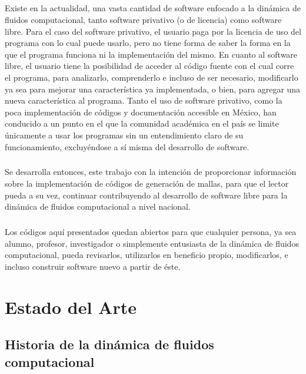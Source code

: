 \documentclass[letterpaper, openright, 12pt]{book}
\begin{document}
    \paragraph*{}
    Existe en la actualidad, una vasta cantidad de software enfocado a la
    dinámica de fluidos computacional, tanto software privativo (o de
    licencia) como software libre. Para el caso del software privativo, el
    usuario paga por la licencia de uso del programa con lo cual puede
    usarlo, pero no tiene forma de saber la forma en la que el programa
    funciona ni la implementación del mismo. En cuanto al software libre,
    el usuario tiene la posibilidad de acceder al código fuente con el cual
    corre el programa, para analizarlo, comprenderlo e incluso de ser
    necesario, modificarlo ya sea para mejorar una característica ya
    implementada, o bien, para agregar una nueva característica al programa.
    Tanto el uso de software privativo, como la poca implementación de
    códigos y documentación accesible en México, han conducido a un punto en
    el que la comunidad académica en el país se limite únicamente a usar los
    programas sin un entendimiento claro de su funcionamiento, excluyéndose
    a sí misma del desarrollo de software.

    \paragraph*{}
    Se desarrolla entonces, este trabajo con la intención de proporcionar
    información sobre la implementación de códigos de generación de mallas,
    para que el lector pueda a su vez, continuar contribuyendo al desarrollo
    de software libre para la dinámica de fluidos computacional a nivel
    nacional.

    \paragraph*{}
    Los códigos aquí presentados quedan abiertos para que cualquier persona,
    ya sea alumno, profesor, investigador o  simplemente entusiasta de la
    dinámica de fluidos computacional, pueda revisarlos, utilizarlos en
    beneficio propio, modificarlos, e incluso construir software nuevo a
    partir de éste.
%
%
%
%

%
%
%
%
\chapter{Estado del Arte}
    \section{Historia de la dinámica de fluidos computacional}
\end{document}
